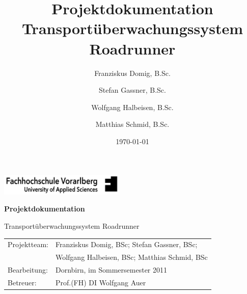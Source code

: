 \documentclass[11pt,a4paper]{article}
\title{
	Projektdokumentation\\
	Transportüberwachungssystem Roadrunner
}
\author{
	Franziskus Domig, B.Sc.\\
		\and
	Stefan Gassner, B.Sc.\\
		\and
	Wolfgang Halbeisen, B.Sc.\\
		\and
	Matthias Schmid, B.Sc.\\	
}
\date{\today}
\begin{document}
	

\pagestyle{empty} %

\begin{center}

\includegraphics[width=60mm]{files/logo-fhv.png}

\vspace{4cm}
{\large\textbf{Projektdokumentation}}\vspace{.5cm}

{\LARGE Transportüberwachungssystem Roadrunner}

\end{center}

\vspace{13cm}


\begin{tabular}{ll}
	Projektteam: & Franziskus Domig, BSc; Stefan Gassner, BSc;\\
	     	& Wolfgang Halbeisen, BSc; Matthias Schmid, BSc\\
	Bearbeitung: & Dornbirn, im Sommersemester 2011\\
	Betreuer:    & Prof.(FH) DI Wolfgang Auer\\
\end{tabular}


\clearpage
\pagestyle{fancy}
\setcounter{page}{1}



\clearpage
\tableofcontents

\clearpage
{}
\setcounter{page}{1}

\fancyfoot[CO]{\thepage}



\clearpage


\clearpage


\clearpage


\clearpage


\clearpage

\end{document}
